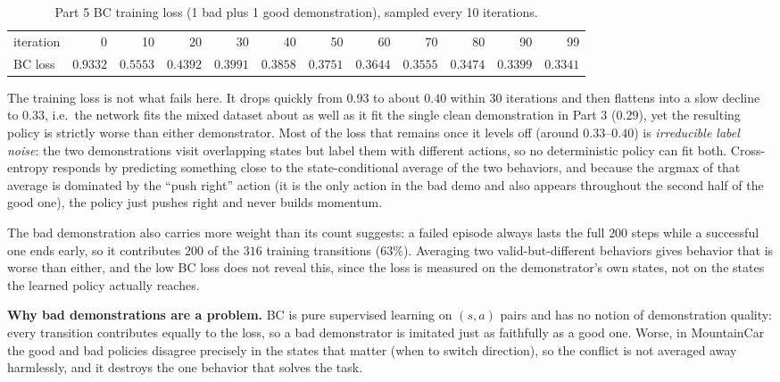 \documentclass[12pt]{article}%
\begin{document}
\begin{table}[h]
\centering
\footnotesize
\setlength{\tabcolsep}{4pt}
\caption{Part 5 BC training loss (1 bad plus 1 good demonstration), sampled every 10 iterations.}
\label{tab:p5loss}
\begin{tabular}{@{}l*{11}{r}@{}}
\toprule
iteration & 0 & 10 & 20 & 30 & 40 & 50 & 60 & 70 & 80 & 90 & 99 \\
BC loss & $0.9332$ & $0.5553$ & $0.4392$ & $0.3991$ & $0.3858$ & $0.3751$ & $0.3644$ & $0.3555$ & $0.3474$ & $0.3399$ & $0.3341$ \\
\bottomrule
\end{tabular}
\end{table}

The training loss is not what fails here. It drops quickly from $0.93$ to about $0.40$
within 30 iterations and then flattens into a slow decline to $0.33$, i.e.\ the network
fits the mixed dataset about as well as it fit the single clean demonstration in Part 3
($0.29$), yet the resulting policy is strictly worse than either demonstrator. Most of the
loss that remains once it levels off (around $0.33$--$0.40$) is \emph{irreducible label
noise}: the two
demonstrations visit overlapping states but label them with different actions, so no
deterministic policy can fit both. Cross-entropy responds by predicting something close to
the state-conditional average of the two behaviors, and because the argmax of that average
is dominated by the ``push right'' action (it is the only action in the bad demo and also
appears throughout the second half of the good one), the policy just pushes right and never
builds momentum.

The bad demonstration also carries more weight than its count suggests: a failed episode
always lasts the full $200$ steps while a successful one ends early, so it contributes $200$
of the $316$ training transitions ($63\%$). Averaging two valid-but-different behaviors gives
behavior that is worse than either, and the low BC loss does not reveal this, since the loss
is measured on the demonstrator's own states, not on the states the learned policy actually
reaches.

\medskip
\noindent\textbf{Why bad demonstrations are a problem.} BC is pure supervised learning on
$(s,a)$ pairs and has no notion of demonstration quality: every transition contributes
equally to the loss, so a bad demonstrator is imitated just as faithfully as a good one.
Worse, in MountainCar the good and bad policies disagree precisely in the states that
matter (when to switch direction), so the conflict is not averaged away harmlessly, and it
destroys the one behavior that solves the task.
\end{document}
